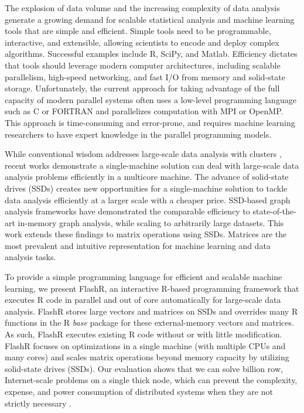 
The explosion of data volume and the increasing complexity of data analysis
generate a growing demand for scalable statistical analysis and machine
learning tools that are simple and efficient.
Simple tools need to be programmable, interactive, and extensible, 
allowing scientists to encode and deploy complex algorithms. 
Successful examples include R, SciPy, and Matlab.  Efficiency dictates that
tools should leverage modern computer architectures, including scalable
parallelism, high-speed networking, and fast I/O from memory and solid-state
storage. Unfortunately, the current approach for taking advantage of the full
capacity of modern parallel systems often uses a low-level programming
language such as C or FORTRAN and parallelizes computation with MPI or OpenMP.
This approach is time-consuming and error-prone, and requires machine learning
researchers to have expert knowledge in the parallel programming models.
 

While conventional wisdom addresses large-scale data analysis with clusters
\cite{mapreduce,spark,h2o,systemml,tensorflow,petuum}, recent works
\cite{flashgraph,gridgraph,Matveev17,hotos} demonstrate a single-machine solution
can deal with large-scale data analysis problems efficiently in a multicore
machine. The advance of solid-state drives (SSDs) creates new opportunities
for a single-machine solution to tackle data analysis efficiently at a larger scale
with a cheaper price. SSD-based graph analysis frameworks \cite{flashgraph, gridgraph}
have demonstrated the comparable efficiency to state-of-the-art in-memory graph
analysis, while scaling to arbitrarily large datasets. This work extends
these findings to matrix operations using SSDs. Matrices are the most prevalent
and intuitive representation for machine learning and data analysis tasks.


To provide a simple programming language for efficient and scalable machine
learning, we present FlashR, an interactive R-based programming framework that
executes R code in parallel and
out of core automatically for large-scale data analysis. FlashR stores large
vectors and matrices on SSDs and overrides many R functions in the R
\textit{base} package for these external-memory vectors and matrices.
As such, FlashR executes existing R code without or with little modification.
FlashR focuses on optimizations in a single machine (with multiple CPUs and
many cores) and scales matrix operations beyond memory capacity by 
utilizing solid-state drives (SSDs).  
Our evaluation shows that we can solve billion row, Internet-scale 
problems on a single thick node, which can prevent the complexity,
expense, and power consumption of distributed systems when they are
not strictly necessary \cite{hotos}.

